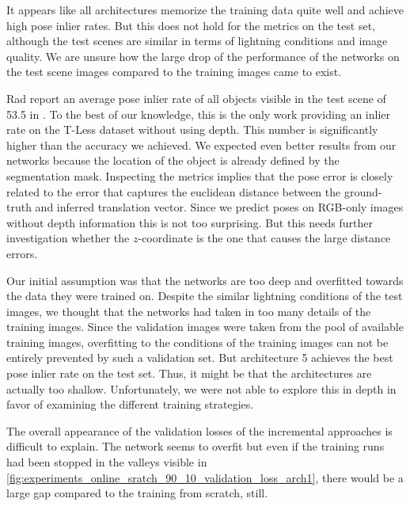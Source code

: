 It appears like all architectures memorize the training data quite well and achieve high pose inlier rates. But this does not hold for the metrics on the test set, although the test scenes are similar in terms of lightning conditions and image quality. We are unsure how the large drop of the performance of the networks on the test scene images compared to the training images came to exist.

Rad \etal report an average pose inlier rate of all objects visible in the test scene of 53.5 in \cite{bb8}. To the best of our knowledge, this is the only work providing an inlier rate on the T-Less dataset without using depth. This number is significantly higher than the accuracy we achieved. We expected even better results from our networks because the location of the object is already defined by the segmentation mask. Inspecting the metrics implies that the pose error is closely related to the error that captures the euclidean distance between the ground-truth and inferred translation vector. Since we predict poses on RGB-only images without depth information this is not too surprising. But this needs further investigation whether the $z$-coordinate is the one that causes the large distance errors.

Our initial assumption was that the networks are too deep and overfitted towards the data they were trained on. Despite the similar lightning conditions of the test images, we thought that the networks had taken in too many details of the training images. Since the validation images were taken from the pool of available training images, overfitting to the conditions of the training images can not be entirely prevented by such a validation set. But architecture 5 achieves the best pose inlier rate on the test set. Thus, it might be that the architectures are actually too shallow. Unfortunately, we were not able to explore this in depth in favor of examining the different training strategies.

The overall appearance of the validation losses of the incremental approaches is difficult to explain. The network seems to overfit but even if the training runs had been stopped in the valleys visible in \fig \ref{fig:experiments_online_sratch_90_10_validation_loss_arch1}, there would be a large gap compared to the training from scratch, still.

